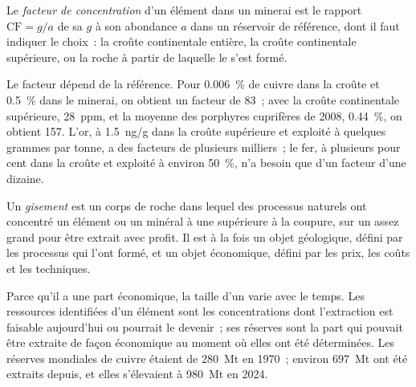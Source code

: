 \begin{definition}\label{def:b2:ore-deposits:cf}
Le \emph{facteur de concentration} d'un élément dans un minerai est
le rapport $\mathrm{CF} = g/a$ de sa  $g$ à son abondance $a$ dans un réservoir de référence,
dont il faut indiquer le choix~: la croûte continentale entière, la croûte continentale supérieure, ou la roche à partir de laquelle le  s'est formé.
\end{definition}

Le facteur dépend de la référence. Pour \qty{0.006}{\percent} de cuivre dans la croûte et
\qty{0.5}{\percent} dans le minerai, on obtient un facteur de 83~; avec la croûte continentale
supérieure, \qty{28}{ppm}, et la  moyenne des porphyres cuprifères de 2008,
\qty{0.44}{\percent}, on obtient 157. L'or, à \qty{1.5}{ng/g} dans la croûte supérieure et exploité
à quelques grammes par tonne, a des facteurs de plusieurs milliers~; le fer, à plusieurs pour cent
dans la croûte et exploité à environ \qty{50}{\percent}, n'a besoin que d'un facteur d'une dizaine.

\begin{definition}[Gisement]\label{def:b2:ore-deposits:deposit}
Un \emph{gisement} est un corps de roche dans lequel des processus naturels ont
concentré un élément ou un minéral à une  supérieure à la coupure, sur un  assez grand
pour être extrait avec profit. Il est à la fois un objet géologique, défini par les processus qui
l'ont formé, et un objet économique, défini par les prix, les coûts et les techniques.
\end{definition}

Parce qu'il a une part économique, la taille d'un  varie avec le temps. Les ressources
identifiées d'un élément sont les concentrations dont l'extraction est faisable aujourd'hui ou
pourrait le devenir~; ses réserves sont la part qui pouvait être extraite de façon économique au
moment où elles ont été déterminées. Les réserves mondiales de cuivre étaient de \qty{280}{Mt} en
1970~; environ \qty{697}{Mt} ont été extraits depuis, et elles s'élevaient à \qty{980}{Mt} en 2024.

